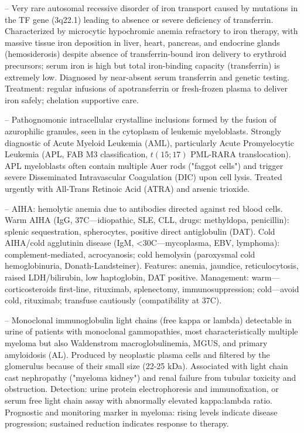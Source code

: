 -- Very rare autosomal recessive disorder of iron transport caused by mutations in the TF gene (3q22.1) leading to absence or severe deficiency of transferrin. Characterized by microcytic hypochromic anemia refractory to iron therapy, with massive tissue iron deposition in liver, heart, pancreas, and endocrine glands (hemosiderosis) despite absence of transferrin-bound iron delivery to erythroid precursors; serum iron is high but total iron-binding capacity (transferrin) is extremely low. Diagnosed by near-absent serum transferrin and genetic testing. Treatment: regular infusions of apotransferrin or fresh-frozen plasma to deliver iron safely; chelation supportive care.

-- Pathognomonic intracellular crystalline inclusions formed by the fusion of azurophilic granules, seen in the cytoplasm of leukemic myeloblasts. Strongly diagnostic of Acute Myeloid Leukemia (AML), particularly Acute Promyelocytic Leukemia (APL, FAB M3 classification, $t(15;17)$ PML-RARA translocation). APL myeloblasts often contain multiple Auer rods ("faggot cells") and trigger severe Disseminated Intravascular Coagulation (DIC) upon cell lysis. Treated urgently with All-Trans Retinoic Acid (ATRA) and arsenic trioxide.

-- AIHA: hemolytic anemia due to antibodies directed against red blood cells. Warm AIHA (IgG, 37C—idiopathic, SLE, CLL, drugs: methyldopa, penicillin): splenic sequestration, spherocytes, positive direct antiglobulin (DAT). Cold AIHA/cold agglutinin disease (IgM, <30C—mycoplasma, EBV, lymphoma): complement-mediated, acrocyanosis; cold hemolysin (paroxysmal cold hemoglobinuria, Donath-Landsteiner). Features: anemia, jaundice, reticulocytosis, raised LDH/bilirubin, low haptoglobin, DAT positive. Management: warm—corticosteroids first-line, rituximab, splenectomy, immunosuppression; cold—avoid cold, rituximab; transfuse cautiously (compatibility at 37C).

-- Monoclonal immunoglobulin light chains (free kappa or lambda) detectable in urine of patients with monoclonal gammopathies, most characteristically multiple myeloma but also Waldenstrom macroglobulinemia, MGUS, and primary amyloidosis (AL). Produced by neoplastic plasma cells and filtered by the glomerulus because of their small size (22-25 kDa). Associated with light chain cast nephropathy ("myeloma kidney") and renal failure from tubular toxicity and obstruction. Detection: urine protein electrophoresis and immunofixation, or serum free light chain assay with abnormally elevated kappa:lambda ratio. Prognostic and monitoring marker in myeloma: rising levels indicate disease progression; sustained reduction indicates response to therapy.

